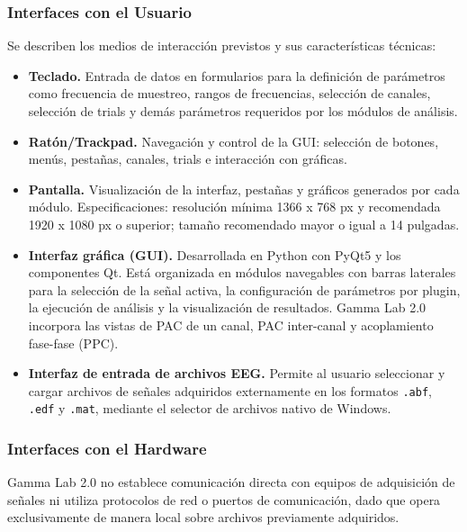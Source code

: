 \documentclass[12pt, letterpaper]{article}
\begin{document}
\subsubsection{Interfaces con el Usuario}

Se describen los medios de interacción previstos y sus características
técnicas:

\begin{itemize}

    \item \textbf{Teclado.} Entrada de datos en formularios para la
    definición de parámetros como frecuencia de muestreo, rangos de
    frecuencias, selección de canales, selección de trials y demás
    parámetros requeridos por los módulos de análisis.

    \item \textbf{Ratón/Trackpad.} Navegación y control de la GUI: selección
    de botones, menús, pestañas, canales, trials e interacción con gráficas.

    \item \textbf{Pantalla.} Visualización de la interfaz, pestañas y
    gráficos generados por cada módulo. Especificaciones: resolución mínima
    1366 x 768 px y recomendada 1920 x 1080 px o superior; tamaño
    recomendado mayor o igual a 14 pulgadas.

    \item \textbf{Interfaz gráfica (GUI).} Desarrollada en Python con
    PyQt5 y los componentes Qt. Está organizada en módulos navegables con
    barras laterales para la selección de la señal activa, la configuración
    de parámetros por plugin, la ejecución de análisis y la visualización
    de resultados. Gamma Lab 2.0 incorpora las vistas de PAC de un canal, PAC
    inter-canal y acoplamiento fase-fase (PPC).

    \item \textbf{Interfaz de entrada de archivos EEG.} Permite al usuario
    seleccionar y cargar archivos de señales adquiridos externamente en los
    formatos \texttt{.abf}, \texttt{.edf} y \texttt{.mat},
    mediante el selector de archivos nativo de Windows.

\end{itemize}

\subsubsection{Interfaces con el Hardware}

Gamma Lab 2.0 no establece comunicación directa con equipos de adquisición de
señales ni utiliza protocolos de red o puertos de comunicación, dado que
opera exclusivamente de manera local sobre archivos previamente adquiridos.
\end{document}
